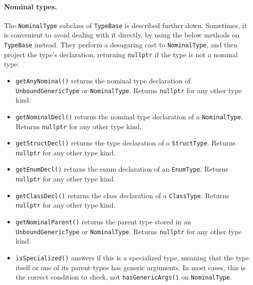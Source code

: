 \documentclass[../generics]{subfiles}
\begin{document}
\paragraph{Nominal types.} The \texttt{NominalType} subclass of \texttt{TypeBase} is described further down. Sometimes, it is convenient to avoid dealing with it directly, by using the below methods on \texttt{TypeBase} instead. They perform a desugaring cast to \texttt{NominalType}, and then project the type's declaration, returning \texttt{nullptr} if the type is not a nominal type:
\begin{itemize}
\item \texttt{getAnyNominal()} returns the nominal type declaration of \texttt{UnboundGenericType} or \texttt{NominalType}. Returns \texttt{nullptr} for any other type kind.
\item \texttt{getNominalDecl()} returns the nominal type declaration of a \texttt{NominalType}. Returns \texttt{nullptr} for any other type kind.
\item \texttt{getStructDecl()} returns the type declaration of a \texttt{StructType}. Returns \texttt{nullptr} for any other type kind.
\item \texttt{getEnumDecl()} returns the enum declaration of an \texttt{EnumType}. Returns \texttt{nullptr} for any other type kind.
\item \texttt{getClassDecl()} returns the class declaration of a \texttt{ClassType}. Returns \texttt{nullptr} for any other type kind.
\item \texttt{getNominalParent()} returns the parent type stored in an \texttt{UnboundGenericType} or \texttt{NominalType}. Returns \texttt{nullptr} for any other type kind.
\item \texttt{isSpecialized()} answers if this is a specialized type, meaning that the type itself or one of its parent types has generic arguments. In most cases, this is the correct condition to check, not \texttt{hasGenericArgs()} on \texttt{NominalType}.
\end{itemize}
\end{document}
